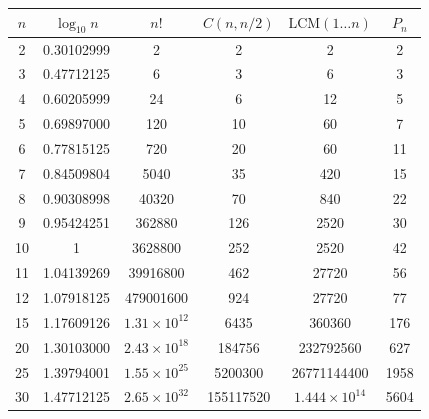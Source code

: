 \begin{table}[H]
	\centering
	\begin{tabular}{c c c c c c}
		\toprule
		\( n \) & \(\log_{10} n\) & \(n!\)                 & \(C(n, n/2)\) & \(\text{LCM}(1\dots n)\) & \(P_n\) \\
		\midrule
		2       & 0.30102999      & 2                      & 2             & 2                        & 2       \\
		3       & 0.47712125      & 6                      & 3             & 6                        & 3       \\
		4       & 0.60205999      & 24                     & 6             & 12                       & 5       \\
		5       & 0.69897000      & 120                    & 10            & 60                       & 7       \\
		6       & 0.77815125      & 720                    & 20            & 60                       & 11      \\
		7       & 0.84509804      & 5040                   & 35            & 420                      & 15      \\
		8       & 0.90308998      & 40320                  & 70            & 840                      & 22      \\
		9       & 0.95424251      & 362880                 & 126           & 2520                     & 30      \\
		10      & 1               & 3628800                & 252           & 2520                     & 42      \\
		11      & 1.04139269      & 39916800               & 462           & 27720                    & 56      \\
		12      & 1.07918125      & 479001600              & 924           & 27720                    & 77      \\
		15      & 1.17609126      & \(1.31\times 10^{12}\) & 6435          & 360360                   & 176     \\
		20      & 1.30103000      & \(2.43\times 10^{18}\) & 184756        & 232792560                & 627     \\
		25      & 1.39794001      & \(1.55\times 10^{25}\) & 5200300       & 26771144400              & 1958    \\
		30      & 1.47712125      & \(2.65\times 10^{32}\) & 155117520     & \(1.444\times 10^{14}\)  & 5604    \\
		\bottomrule
	\end{tabular}
\end{table}

